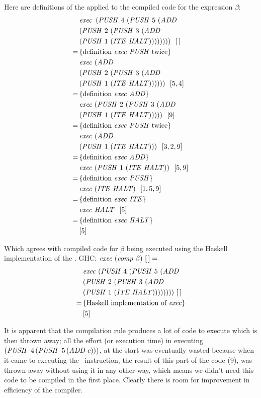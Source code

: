 \documentclass {article}
\begin{document}
Here are definitions of the \vm 
applied to the compiled code for the expression $\beta$:
\begin{align*}
	&\mathit{exec\ } \, (\mathit{PUSH\ } 4\ (\mathit{PUSH\ } 5\ (\mathit{ADD\ } \\
			&(\mathit{PUSH\ } 2\ (\mathit{PUSH\ } 3\ (\mathit{ADD\ } \\
			&(\mathit{PUSH\ } 1\ (\mathit{ITE\ } \mathit{HALT}))))))))\ \ [\, ] \\
	=\, & \{ \mbox{definition \textit{exec}\ \textit{PUSH}\ twice} \} \\ 
	&\mathit{exec\ } (\mathit{ADD\ } \\
			&(\mathit{PUSH\ } 2\ (\mathit{PUSH\ } 3\ (\mathit{ADD\ } \\
			&(\mathit{PUSH\ } 1\ (\mathit{ITE\ } \mathit{HALT}))))))\ \ [5,4] \\
	=\, & \{ \mbox{definition \textit{exec}\ \textit{ADD}} \} \\
	&\mathit{exec\ } (\mathit{PUSH\ } 2\ (\mathit{PUSH\ } 3\ (\mathit{ADD\ } \\
			&(\mathit{PUSH\ } 1\ (\mathit{ITE\ } \mathit{HALT})))))\ \ [9] \\
	=\, & \{ \mbox{definition \textit{exec}\ \textit{PUSH}\ twice} \} \\ 
	&\mathit{exec\ } (\mathit{ADD\ } \\
			&(\mathit{PUSH\ } 1\ (\mathit{ITE\ } \mathit{HALT})))\ \ [3, 2, 9] \\
	=\, & \{ \mbox{definition \textit{exec}\ \textit{ADD}} \} \\
	&\mathit{exec\ } (\mathit{PUSH\ } 1\ (\mathit{ITE\ } \mathit{HALT}))\ \ [5, 9] \\
	=\, & \{ \mbox{definition \textit{exec}\ \textit{PUSH}} \} \\
	&\mathit{exec\ } (\mathit{ITE\ } \mathit{HALT})\ \ [1, 5, 9] \\
	=\, & \{ \mbox{definition \textit{exec}\ \textit{ITE}} \} \\
	&\mathit{exec\ } \mathit{HALT} \ \ [5] \\
	=\, & \{ \mbox{definition \textit{exec}\ \textit{HALT}} \} \\
	&[5]
\end{align*}

Which agrees with compiled code for $\beta$ being executed
using the Haskell implementation of the \vm.
GHC: \( \mathit{exec\ } (\mathit{comp\ } \beta)\ [\, ] =\) 
\begin{align*}
&\mathit{exec\ } (\mathit{PUSH\ } 4\ (\mathit{PUSH\ } 5\ (\mathit{ADD\ } \\
			&(\mathit{PUSH\ } 2\ (\mathit{PUSH\ } 3\ (\mathit{ADD\ } \\
			&(\mathit{PUSH\ } 1\ (\mathit{ITE\ } \mathit{HALT}))))))))\ [\, ] \\
=\, & \{ \mbox{Haskell implementation of \textit{exec}} \} \\
&[5] 
\end{align*}

It is apparent that the compilation rule produces a lot
of code to execute which is then thrown away;
all the effort (or execution time) in executing 
\( (\mathit{PUSH\ }\, 4\, (\mathit{PUSH\ }\, 5\, (\mathit{ADD\ } c))) \), 
at the start was eventually wasted because when it came
to executing the \ITEt\ instruction, 
the result of this part of the code (9),
 was thrown away without using it in any other way,
which means we didn't need this code to be compiled
in the first place. 
Clearly there is room for improvement in 
efficiency of the compiler.
\end{document}
